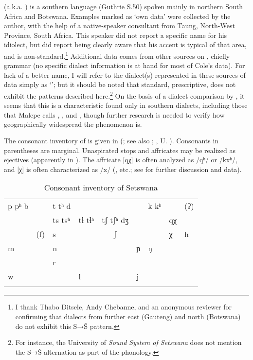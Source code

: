  (a.k.a. ) is a southern  language (Guthrie S.50) spoken mainly in northern South Africa and Botswana. Examples marked as ‘own data’ were collected by the author, with the help of a native-speaker consultant from Taung, North-West Province, South Africa. This speaker did not report a specific name for his idiolect, but did report being clearly aware that his accent is typical of that area, and is non-standard.\footnote{I thank Thabo Ditsele, Andy Chebanne, and an anonymous reviewer for confirming that  dialects from further east (Gauteng) and north (Botswana) do not exhibit this S→Š pattern.} Additional data comes from other sources on , chiefly  grammar (no specific dialect information is at hand for most of Cole’s data). For lack of a better name, I will refer to the dialect(s) represented in these sources of data simply as ‘’; but it should be noted that standard, prescriptive,  does not exhibit the patterns described here.\footnote{For instance, the University of  \textit{Sound System of Setswana} does not mention the S→Š alternation as part of the phonology.} On the basis of a dialect comparison by \citet{Malepe1966}, it seems that this is a characteristic found only in southern dialects, including those that Malepe calls , , and , though further research is needed to verify how geographically widespread the phenomenon is.

The consonant inventory of  is given in  %
 (\citealt{Bennett2016}; see also \citealt{Cole1955}; \citealt{chebanneetal1997}, U. \citealt{University-of-Botswana:2001aa}). Consonants in parentheses are marginal. Unaspirated stops and affricates may be realized as ejectives (apparently in ). The affricate [qχ] is often analyzed as /qʰ/ or /kxʰ/, and [χ] is often characterized as /x/ (\citealt{Cole1955}, etc.; see \citealt{Bennett2016} for further discussion and data).
 
\begin{table}
\begin{tabularx}{\textwidth}{XXXXcXXXX}
\lsptoprule

p pʰ   b &  & t   tʰ   d &  &  &  & k  kʰ &  & (ʔ)\\
&  & ts tsʰ & tɬ   tɬʰ & tʃ   tʃʰ  dʒ &  &  & qχ & \\
& (f) & s &  & ʃ &  &  & χ & h \\
m &  & n &  &  & ɲ & ŋ &  & \\
&  & r &  &  &  &  &  & \\
w &  &  & l &  & j &  &  & \\
\lspbottomrule
\end{tabularx}
\caption{Consonant inventory of Setswana}
\label{tab:bennett:1}
\end{table}

